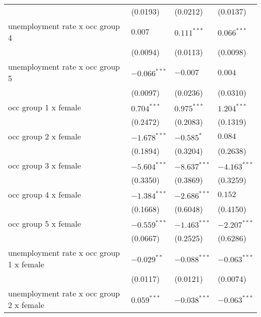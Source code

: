 \begin{tabular}{llll}
                                         &           (0.0193) &           (0.0212) &           (0.0137) \\
unemployment rate x occ group 4          &            $0.007$ &      $0.111^{***}$ &      $0.066^{***}$ \\
                                         &           (0.0094) &           (0.0113) &           (0.0098) \\
unemployment rate x occ group 5          &     $-0.066^{***}$ &           $-0.007$ &            $0.004$ \\
                                         &           (0.0097) &           (0.0236) &           (0.0310) \\
occ group 1 x female                     &      $0.704^{***}$ &      $0.975^{***}$ &      $1.204^{***}$ \\
                                         &           (0.2472) &           (0.2083) &           (0.1319) \\
occ group 2 x female                     &     $-1.678^{***}$ &         $-0.585^*$ &            $0.084$ \\
                                         &           (0.1894) &           (0.3204) &           (0.2638) \\
occ group 3 x female                     &     $-5.604^{***}$ &     $-8.637^{***}$ &     $-4.163^{***}$ \\
                                         &           (0.3350) &           (0.3869) &           (0.3259) \\
occ group 4 x female                     &     $-1.384^{***}$ &     $-2.686^{***}$ &            $0.152$ \\
                                         &           (0.1668) &           (0.6048) &           (0.4150) \\
occ group 5 x female                     &     $-0.559^{***}$ &     $-1.463^{***}$ &     $-2.207^{***}$ \\
                                         &           (0.0667) &           (0.2525) &           (0.6286) \\
unemployment rate x occ group 1 x female &      $-0.029^{**}$ &     $-0.088^{***}$ &     $-0.063^{***}$ \\
                                         &           (0.0117) &           (0.0121) &           (0.0074) \\
unemployment rate x occ group 2 x female &      $0.059^{***}$ &     $-0.038^{***}$ &     $-0.063^{***}$ \\

\end{tabular}
